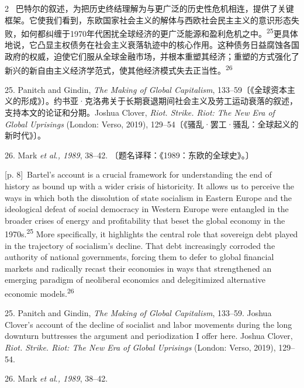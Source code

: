 \documentclass[10pt,a4paper]{article}
\begin{document}
\begin{paracol}{2}
\switchcolumn*
{\scriptsize\color{gray} [p. 8]}\ 巴特尔的叙述，为把历史终结理解为与更广泛的历史性危机相连，提供了关键框架。它使我们看到，东欧国家社会主义的解体与西欧社会民主主义的意识形态失败，如何都纠缠于1970年代困扰全球经济的更广泛能源和盈利危机之\mbox{中。\textsuperscript{25}}更具体地说，它凸显主权债务在社会主义衰落轨迹中的核心作用。这种债务日益腐蚀各国政府的权威，迫使它们服从全球金融市场，并根本重塑其经济；重塑的方式强化了新兴的新自由主义经济学范式，使其他经济模式失去正当\mbox{性。\textsuperscript{26}}\par{\small 25. Panitch and Gindin, \textit{The Making of Global Capitalism}, 133–59〔《全球资本主义的形成》〕。约书亚·克洛弗关于长期衰退期间社会主义及劳工运动衰落的叙述，支持本文的论证和分期。Joshua Clover, \textit{Riot. Strike. Riot: The New Era of Global Uprisings} (London: Verso, 2019), 129–54〔《骚乱·罢工·骚乱：全球起义的新时代》〕。\par}{\small 26. Mark \textit{et al}.\textit{, 1989}, 38–42. 〔题名译释：《1989：东欧的全球史》。〕\par}
\switchcolumn
{\scriptsize\color{gray} [p. 8]}\ Bartel’s account is a crucial framework for understanding the end of history as bound up with a wider crisis of historicity. It allows us to perceive the ways in which both the dissolution of state socialism in Eastern Europe and the ideological defeat of social democracy in Western Europe were entangled in the broader crises of energy and profitability that beset the global economy in the 1970s.\nobreak\textsuperscript{25} More specifically, it highlights the central role that sovereign debt played in the trajectory of socialism’s decline. That debt increasingly corroded the authority of national governments, forcing them to defer to global financial markets and radically recast their economies in ways that strengthened an emerging paradigm of neoliberal economics and delegitimized alternative economic models.\nobreak\textsuperscript{26}\par{\small 25. Panitch and Gindin, \textit{The Making of Global Capitalism}, 133–59. Joshua Clover’s account of the decline of socialist and labor movements during the long downturn buttresses the argument and periodization I offer here. Joshua Clover, \textit{Riot. Strike. Riot: The New Era of Global Uprisings} (London: Verso, 2019), 129–54.\par}{\small 26. Mark \textit{et al}.\textit{, 1989}, 38–42.\par}
\switchcolumn*

\end{paracol}
\end{document}
